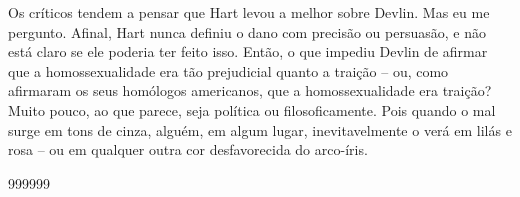  
\par
 
Os críticos tendem a pensar que Hart levou a melhor sobre Devlin. Mas eu me pergunto. Afinal, Hart nunca definiu o dano com precisão ou persuasão, e não está claro se ele poderia ter feito isso. Então, o que impediu Devlin de afirmar que a homossexualidade era tão prejudicial quanto a traição – ou, como afirmaram os seus homólogos americanos, que a homossexualidade era traição? Muito pouco, ao que parece, seja política ou filosoficamente. Pois quando o mal surge em tons de cinza, alguém, em algum lugar, inevitavelmente o verá em lilás e rosa – ou em qualquer outra cor desfavorecida do arco-íris.
 
\par
  
 
999999
